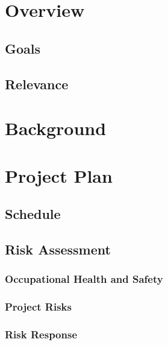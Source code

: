 \documentclass[pdftex,12pt,a4paper]{article}
\begin{document}
%

\tableofcontents

\section{Overview}
\subsection{Goals}
\subsection{Relevance}

\section{Background}

\section{Project Plan}
\subsection{Schedule}
\subsection{Risk Assessment}
\subsubsection{Occupational Health and Safety}
\subsubsection{Project Risks}
\subsubsection{Risk Response}
\end{document}
